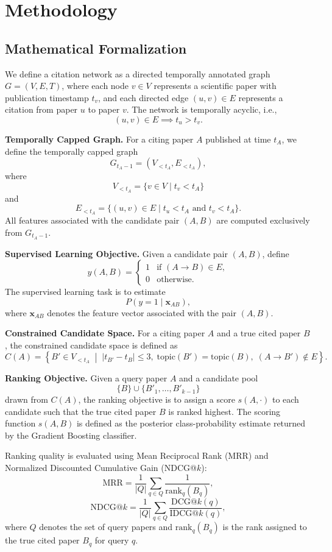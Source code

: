 \documentclass[11pt,a4paper]{article}
\begin{document}
\section{Methodology}
\label{sec:method}

\subsection{Mathematical Formalization}

We define a citation network as a directed temporally annotated graph \(G = (V,E,T)\), where each node \(v \in V\) represents a scientific paper with publication timestamp \(t_v\), and each directed edge \((u,v) \in E\) represents a citation from paper \(u\) to paper \(v\). The network is temporally acyclic, i.e.,
\[
(u,v) \in E \implies t_u > t_v.
\]

\textbf{Temporally Capped Graph.}
For a citing paper \(A\) published at time \(t_A\), we define the temporally capped graph
\[
G_{t_A-1} = (V_{<t_A}, E_{<t_A}),
\]
where
\[
V_{<t_A} = \{v \in V \mid t_v < t_A\}
\]
and
\[
E_{<t_A} = \{(u,v) \in E \mid t_u < t_A \text{ and } t_v < t_A\}.
\]
All features associated with the candidate pair \((A,B)\) are computed exclusively from \(G_{t_A-1}\).

\textbf{Supervised Learning Objective.}
Given a candidate pair \((A,B)\), define
\[
y(A,B)=
\begin{cases}
1 & \text{if } (A \to B)\in E,\\
0 & \text{otherwise}.
\end{cases}
\]
The supervised learning task is to estimate
\[
P\!\left(y=1 \mid \mathbf{x}_{AB}\right),
\]
where \(\mathbf{x}_{AB}\) denotes the feature vector associated with the pair \((A,B)\).

\textbf{Constrained Candidate Space.}
For a citing paper \(A\) and a true cited paper \(B\), the constrained candidate space is defined as
\[
C(A)=
\left\{
B' \in V_{<t_A}
\;\middle|\;
|t_{B'}-t_B| \le 3,\;
\mathrm{topic}(B')=\mathrm{topic}(B),\;
(A \to B') \notin E
\right\}.
\]

\textbf{Ranking Objective.}
Given a query paper \(A\) and a candidate pool
\[
\{B\} \cup \{B'_1,\ldots,B'_{k-1}\}
\]
drawn from \(C(A)\), the ranking objective is to assign a score \(s(A,\cdot)\) to each candidate such that the true cited paper \(B\) is ranked highest. The scoring function \(s(A,B)\) is defined as the posterior class-probability estimate returned by the Gradient Boosting classifier.

Ranking quality is evaluated using Mean Reciprocal Rank (MRR) and Normalized Discounted Cumulative Gain (NDCG@\(k\)):
\[
\mathrm{MRR}
=
\frac{1}{|Q|}
\sum_{q \in Q}
\frac{1}{\mathrm{rank}_q(B_q)},
\]
\[
\mathrm{NDCG@}k
=
\frac{1}{|Q|}
\sum_{q \in Q}
\frac{\mathrm{DCG@}k(q)}
{\mathrm{IDCG@}k(q)},
\]
where \(Q\) denotes the set of query papers and \(\mathrm{rank}_q(B_q)\) is the rank assigned to the true cited paper \(B_q\) for query \(q\).
\end{document}
